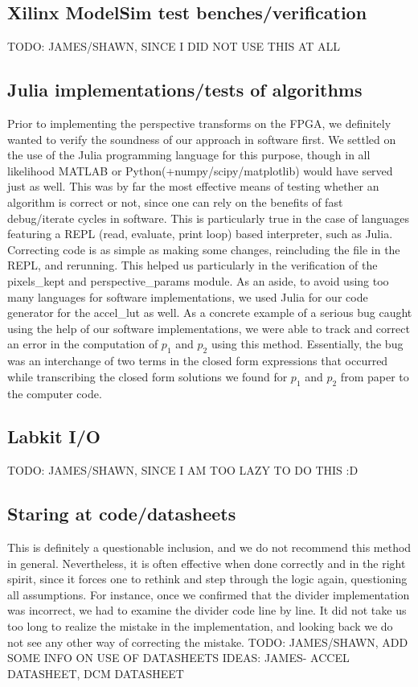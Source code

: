 \documentclass{article}
\begin{document}
\subsection{Xilinx ModelSim test benches/verification}
TODO: JAMES/SHAWN, SINCE I DID NOT USE THIS AT ALL

\subsection{Julia implementations/tests of algorithms}
Prior to implementing the perspective transforms on the FPGA,
we definitely wanted to verify the soundness of our approach in software first.
We settled on the use of the Julia programming language for this purpose,
though in all likelihood MATLAB or Python(+numpy/scipy/matplotlib) would have served just as well.
This was by far the most effective means of testing whether an algorithm is correct or not,
since one can rely on the benefits of fast debug/iterate cycles in software.
This is particularly true in the case of languages featuring a REPL (read, evaluate, print loop) based interpreter, such as Julia.
Correcting code is as simple as making some changes, reincluding the file in the REPL, and rerunning.
This helped us particularly in the verification of the pixels\_kept and perspective\_params module.
As an aside, to avoid using too many languages for software implementations,
we used Julia for our code generator for the accel\_lut as well.
As a concrete example of a serious bug caught using the help of our software implementations,
we were able to track and correct an error in the computation of $p_1$ and $p_2$ using this method.
Essentially, the bug was an interchange of two terms in the closed form expressions that occurred
while transcribing the closed form solutions we found for $p_1$ and $p_2$ from paper to the computer code.

\subsection{Labkit I/O}
TODO: JAMES/SHAWN, SINCE I AM TOO LAZY TO DO THIS :D

\subsection{Staring at code/datasheets}
This is definitely a questionable inclusion, and we do not recommend this method in general.
Nevertheless, it is often effective when done correctly and in the right spirit,
since it forces one to rethink and step through the logic again, questioning all assumptions.
For instance, once we confirmed that the divider implementation was incorrect,
we had to examine the divider code line by line.
It did not take us too long to realize the mistake in the implementation,
and looking back we do not see any other way of correcting the mistake.
TODO: JAMES/SHAWN, ADD SOME INFO ON USE OF DATASHEETS
IDEAS: JAMES- ACCEL DATASHEET, DCM DATASHEET
\end{document}
